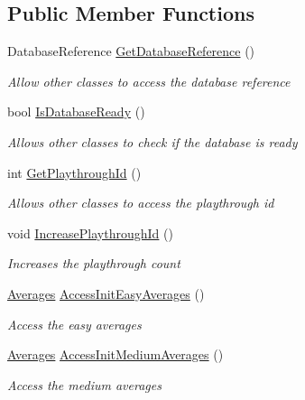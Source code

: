 \subsection*{Public Member Functions}
\begin{DoxyCompactItemize}
\item 
Database\+Reference \mbox{\hyperlink{class_database_manager_a14c609571c0d42f0735da6e8c8ff92c0}{Get\+Database\+Reference}} ()
\begin{DoxyCompactList}\small\item\em Allow other classes to access the database reference \end{DoxyCompactList}\item 
bool \mbox{\hyperlink{class_database_manager_ad0baa3bf8e05288ba738646770672b34}{Is\+Database\+Ready}} ()
\begin{DoxyCompactList}\small\item\em Allows other classes to check if the database is ready \end{DoxyCompactList}\item 
int \mbox{\hyperlink{class_database_manager_a4c6fcf71634e8465870bb7468da305e4}{Get\+Playthrough\+Id}} ()
\begin{DoxyCompactList}\small\item\em Allows other classes to access the playthrough id \end{DoxyCompactList}\item 
void \mbox{\hyperlink{class_database_manager_a8215a2e17e479aa9c2f76bdf1a18a018}{Increase\+Playthrough\+Id}} ()
\begin{DoxyCompactList}\small\item\em Increases the playthrough count \end{DoxyCompactList}\item 
\mbox{\hyperlink{struct_level_generation_1_1_averages}{Averages}} \mbox{\hyperlink{class_database_manager_a8b767bfbaf23f5ebc65fb3616db8932b}{Access\+Init\+Easy\+Averages}} ()
\begin{DoxyCompactList}\small\item\em Access the easy averages \end{DoxyCompactList}\item 
\mbox{\hyperlink{struct_level_generation_1_1_averages}{Averages}} \mbox{\hyperlink{class_database_manager_a7e11fd2b33cec339e52eb3df7b595da1}{Access\+Init\+Medium\+Averages}} ()
\begin{DoxyCompactList}\small\item\em Access the medium averages \end{DoxyCompactList}\item 

\end{DoxyCompactItemize}
